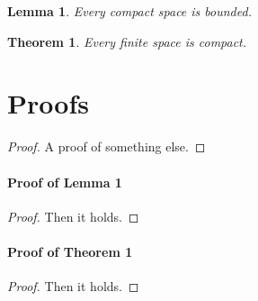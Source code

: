 \documentclass{journal}
\newtheorem{lemma}{Lemma}
\newtheorem{theorem}{Theorem}
\begin{document}
\begin{lemma} Every compact space is bounded. \end{lemma}
\begin{theorem} Every finite space is compact. \end{theorem}
\section{Proofs}
\begin{proof}
A proof of something else.
\end{proof}

\paragraph{Proof of Lemma 1 }
\begin{proof}
Then it holds.
\end{proof}

\paragraph{Proof of Theorem 1}
\begin{proof}
Then it holds.
\end{proof}
\end{document}
